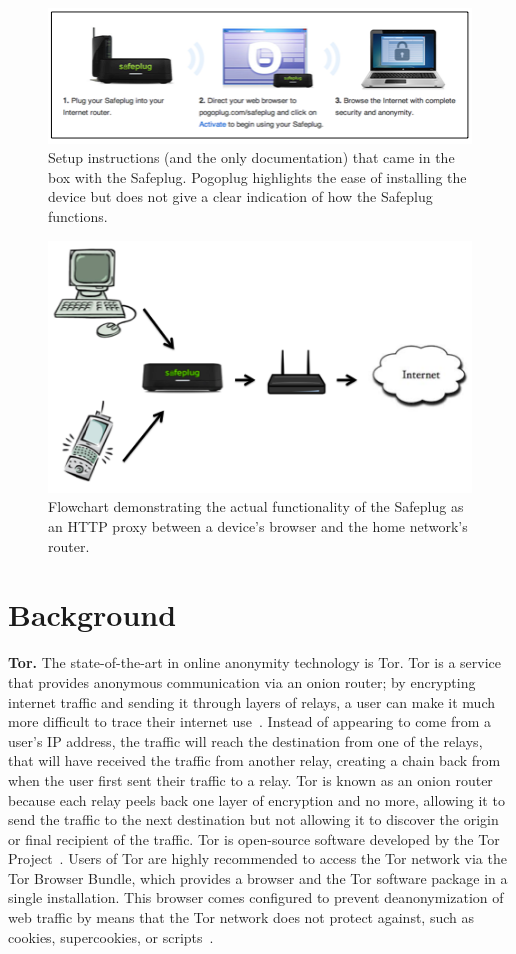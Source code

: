 \documentclass[conference]{IEEEtran}
\begin{document}
\begin{figure}
\centering
\includegraphics[width=.65\textwidth]{instructions2}
\caption{Setup instructions (and the only documentation) that came in the box with the Safeplug. Pogoplug highlights the ease of installing the device but does not give a clear indication of how the Safeplug functions.}
\label{fig:instructions}
\end{figure}  

\begin{figure}
\centering
\includegraphics[width=.4\textwidth]{safeplug_flowchart}
\caption{Flowchart demonstrating the actual functionality of the Safeplug as an HTTP proxy between a device's browser and the home network's router.}
\label{fig:flow}
\end{figure}  

\section{Background}
{\bf Tor.} The state-of-the-art in online anonymity technology is Tor.  Tor is a service that provides anonymous communication via an onion router; by encrypting internet traffic and sending it through layers of relays, a user can make it much more difficult to trace their internet use~\cite{tor}.  Instead of appearing to come from a user's IP address, the traffic will reach the destination from one of the relays, that will have received the traffic from another relay, creating a chain back from when the user first sent their traffic to a relay.  Tor is known as an onion router because each relay peels back one layer of encryption and no more, allowing it to send the traffic to the next destination but not allowing it to discover the origin or final recipient of the traffic.  Tor is open-source software developed by the Tor Project~\cite{torproject}.  Users of Tor are highly recommended to access the Tor network via the Tor Browser Bundle, which provides a browser and the Tor software package in a single installation.  This browser comes configured to prevent deanonymization of web traffic by means that the Tor network does not protect against, such as cookies, supercookies, or scripts~\cite{torproject}.
\end{document}
